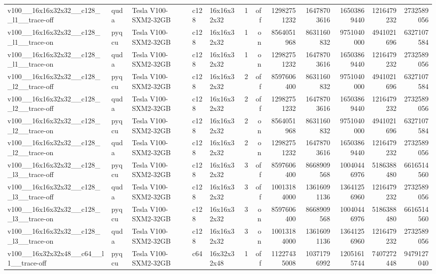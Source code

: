 \begin{table}[htbp]
\begin{tabular}{@{}lllllrrrrrrr@{}}
v100\_\_16x16x32x32\_\_c128\_\_l1\_\_trace-off & quda & Tesla V100-SXM2-32GB & c128 & 16x16x32x32 & 1 & off & 12982751232 & 16478703616 & 16503869440 & 1216479232 & 2732589056 \\
v100\_\_16x16x32x32\_\_c128\_\_l1\_\_trace-on & pyqcu & Tesla V100-SXM2-32GB & c128 & 16x16x32x32 & 1 & on & 8564051968 & 8631160832 & 9751040000 & 4941021696 & 6327107584 \\
v100\_\_16x16x32x32\_\_c128\_\_l1\_\_trace-on & quda & Tesla V100-SXM2-32GB & c128 & 16x16x32x32 & 1 & on & 12982751232 & 16478703616 & 16503869440 & 1216479232 & 2732589056 \\
v100\_\_16x16x32x32\_\_c128\_\_l2\_\_trace-off & pyqcu & Tesla V100-SXM2-32GB & c128 & 16x16x32x32 & 2 & off & 8597606400 & 8631160832 & 9751040000 & 4941021696 & 6327107584 \\
v100\_\_16x16x32x32\_\_c128\_\_l2\_\_trace-off & quda & Tesla V100-SXM2-32GB & c128 & 16x16x32x32 & 2 & off & 12982751232 & 16478703616 & 16503869440 & 1216479232 & 2732589056 \\
v100\_\_16x16x32x32\_\_c128\_\_l2\_\_trace-on & pyqcu & Tesla V100-SXM2-32GB & c128 & 16x16x32x32 & 2 & on & 8564051968 & 8631160832 & 9751040000 & 4941021696 & 6327107584 \\
v100\_\_16x16x32x32\_\_c128\_\_l2\_\_trace-on & quda & Tesla V100-SXM2-32GB & c128 & 16x16x32x32 & 2 & on & 12982751232 & 16478703616 & 16503869440 & 1216479232 & 2732589056 \\
v100\_\_16x16x32x32\_\_c128\_\_l3\_\_trace-off & pyqcu & Tesla V100-SXM2-32GB & c128 & 16x16x32x32 & 3 & off & 8597606400 & 8668909568 & 10040446976 & 5186388480 & 6616514560 \\
v100\_\_16x16x32x32\_\_c128\_\_l3\_\_trace-off & quda & Tesla V100-SXM2-32GB & c128 & 16x16x32x32 & 3 & off & 10013184000 & 13616091136 & 13641256960 & 1216479232 & 2732589056 \\
v100\_\_16x16x32x32\_\_c128\_\_l3\_\_trace-on & pyqcu & Tesla V100-SXM2-32GB & c128 & 16x16x32x32 & 3 & on & 8597606400 & 8668909568 & 10040446976 & 5186388480 & 6616514560 \\
v100\_\_16x16x32x32\_\_c128\_\_l3\_\_trace-on & quda & Tesla V100-SXM2-32GB & c128 & 16x16x32x32 & 3 & on & 10013184000 & 13616091136 & 13641256960 & 1216479232 & 2732589056 \\
v100\_\_16x32x32x48\_\_c64\_\_l1\_\_trace-off & pyqcu & Tesla V100-SXM2-32GB & c64 & 16x32x32x48 & 1 & off & 11227435008 & 10371796992 & 12051615744 & 7407272448 & 9479127040 \\

\end{tabular}
\end{table}
